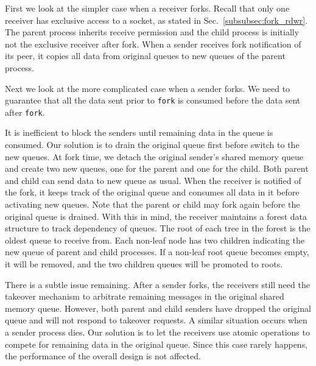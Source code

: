
First we look at the simpler case when a receiver forks. Recall that only one receiver has exclusive access to a socket, as stated in Sec.~\ref{subsubsec:fork_rdwr}. The parent process inherits receive permission and the child process is initially not the exclusive receiver after fork. When a sender receives fork notification of its peer, it copies all data from original queues to new queues of the parent process.

Next we look at the more complicated case when a sender forks. We need to guarantee that all the data sent prior to \texttt{fork} is consumed before the data sent after \texttt{fork}. 

It is inefficient to block the senders until remaining data in the queue is consumed. Our solution is to drain the original queue first before switch to the new queues. At fork time, we detach the original sender's shared memory queue and create two new queues, one for the parent and one for the child. Both parent and child can send data to new queue as usual. When the receiver is notified of the fork, it keeps track of the original queue and consumes all data in it before activating new queues. Note that the parent or child may fork again before the original queue is drained. With this in mind, the receiver maintains a forest data structure to track dependency of queues. The root of each tree in the forest is the oldest queue to receive from. Each non-leaf node has two children indicating the new queue of parent and child processes. If a non-leaf root queue becomes empty, it will be removed, and the two children queues will be promoted to roots.

There is a subtle issue remaining. After a sender forks, the receivers still need the takeover mechanism to arbitrate remaining messages in the original shared memory queue. However, both parent and child senders have dropped the original queue and will not respond to takeover requests. A similar situation occurs when a sender process dies. Our solution is to let the receivers use atomic operations to compete for remaining data in the original queue. Since this case rarely happens, the performance of the overall design is not affected.


